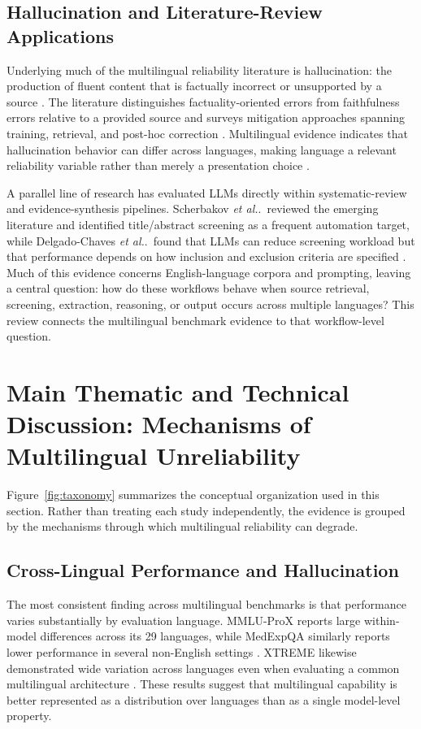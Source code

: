 \documentclass[acmsmall,nonacm]{acmart}
\newcommand{\etal}{\textit{et al.}}
\begin{document}
\subsection{Hallucination and Literature-Review Applications}
Underlying much of the multilingual reliability literature is hallucination: the production of fluent content that is factually incorrect or unsupported by a source \cite{Ji2023,Huang2025}. The literature distinguishes factuality-oriented errors from faithfulness errors relative to a provided source and surveys mitigation approaches spanning training, retrieval, and post-hoc correction \cite{Huang2025}. Multilingual evidence indicates that hallucination behavior can differ across languages, making language a relevant reliability variable rather than merely a presentation choice \cite{Huang2025}.

A parallel line of research has evaluated LLMs directly within systematic-review and evidence-synthesis pipelines. Scherbakov \etal.\ reviewed the emerging literature and identified title/abstract screening as a frequent automation target, while Delgado-Chaves \etal.\ found that LLMs can reduce screening workload but that performance depends on how inclusion and exclusion criteria are specified \cite{Scherbakov2025,DelgadoChaves2025}. Much of this evidence concerns English-language corpora and prompting, leaving a central question: how do these workflows behave when source retrieval, screening, extraction, reasoning, or output occurs across multiple languages? This review connects the multilingual benchmark evidence to that workflow-level question.

\section{Main Thematic and Technical Discussion: Mechanisms of Multilingual Unreliability}\label{sec:mechanisms}
Figure~\ref{fig:taxonomy} summarizes the conceptual organization used in this section. Rather than treating each study independently, the evidence is grouped by the mechanisms through which multilingual reliability can degrade.

\subsection{Cross-Lingual Performance and Hallucination}
The most consistent finding across multilingual benchmarks is that performance varies substantially by evaluation language. MMLU-ProX reports large within-model differences across its 29 languages, while MedExpQA similarly reports lower performance in several non-English settings \cite{Xuan2025,GarcíaFerrero2024}. XTREME likewise demonstrated wide variation across languages even when evaluating a common multilingual architecture \cite{Hu2020}. These results suggest that multilingual capability is better represented as a distribution over languages than as a single model-level property.
\end{document}
